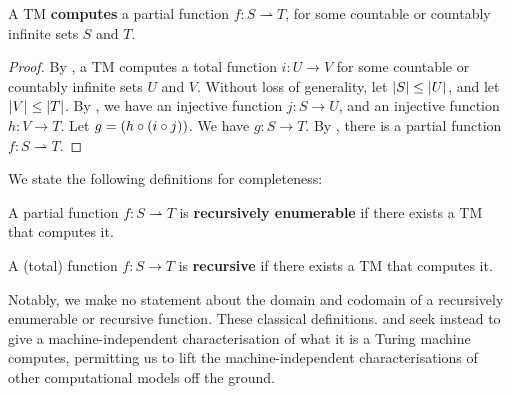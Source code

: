 \begin{theorem} \label{thm:tm-partial} A TM \textbf{computes} a partial
function $f : S \rightharpoonup T$, for some countable or countably infinite
sets $S$ and $T$.\end{theorem}

\begin{proof} By , a TM computes a total function $i : U
\rightarrow V$ for some countable or countably infinite sets $U$ and $V$.
Without loss of generality, let $\mathopen{}\left|{S}\right|\mathclose{}\leq\mathopen{}\left|{U}\right|\mathclose{}$, and let
$\mathopen{}\left|{V}\right|\mathclose{}\leq\mathopen{}\left|{T}\right|\mathclose{}$. By , we have an injective function $j
: S \rightarrow U$, and an injective function $h : V \rightarrow T$. Let
$g=\mathopen{}\left({h \circ \mathopen{}\left({i \circ j}\right)\mathclose{}}\right)\mathclose{}$. We have $g : S \rightarrow T$. By
, there is a partial function $f : S \rightharpoonup
T$.\end{proof}

We state the following definitions for completeness:

\begin{definition} A partial function $f : S \rightharpoonup T$ is
\textbf{recursively enumerable} if there exists a TM that computes it.
\end{definition}

\begin{definition} A (total) function $f : S \rightarrow T$ is
\textbf{recursive} if there exists a TM that computes it. \end{definition}

Notably, we make no statement about the domain and codomain of a recursively
enumerable or recursive function. These classical definitions.
 and  seek instead to give a
machine-independent characterisation of what it is a Turing machine computes,
permitting us to lift the machine-independent characterisations of other
computational models off the ground.


